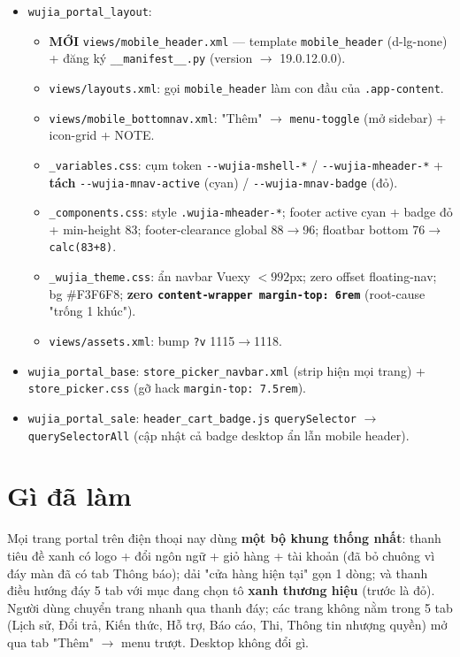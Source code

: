 \begin{itemize}
  \item \texttt{wujia\_portal\_layout}:
    \begin{itemize}
      \item \textbf{MỚI} \texttt{views/mobile\_header.xml} --- template
            \texttt{mobile\_header} (d-lg-none) + đăng ký \texttt{\_\_manifest\_\_.py}
            (version \(\rightarrow\) 19.0.12.0.0).
      \item \texttt{views/layouts.xml}: gọi \texttt{mobile\_header} làm con đầu của
            \texttt{.app-content}.
      \item \texttt{views/mobile\_bottomnav.xml}: "Thêm" \(\rightarrow\)
            \texttt{menu-toggle} (mở sidebar) + icon-grid + NOTE.
      \item \texttt{\_variables.css}: cụm token \texttt{-{}-wujia-mshell-*} /
            \texttt{-{}-wujia-mheader-*} + \textbf{tách} \texttt{-{}-wujia-mnav-active}
            (cyan) / \texttt{-{}-wujia-mnav-badge} (đỏ).
      \item \texttt{\_components.css}: style \texttt{.wujia-mheader-*}; footer
            active cyan + badge đỏ + min-height 83; footer-clearance global
            88\(\rightarrow\)96; floatbar bottom 76\(\rightarrow\)\texttt{calc(83+8)}.
      \item \texttt{\_wujia\_theme.css}: ẩn navbar Vuexy \(<992\)px; zero offset
            floating-nav; bg \#F3F6F8; \textbf{zero \texttt{content-wrapper
            margin-top: 6rem}} (root-cause "trống 1 khúc").
      \item \texttt{views/assets.xml}: bump \texttt{?v} 1115\(\rightarrow\)1118.
    \end{itemize}
  \item \texttt{wujia\_portal\_base}: \texttt{store\_picker\_navbar.xml} (strip hiện
        mọi trang) + \texttt{store\_picker.css} (gỡ hack \texttt{margin-top: 7.5rem}).
  \item \texttt{wujia\_portal\_sale}: \texttt{header\_cart\_badge.js}
        \texttt{querySelector} \(\rightarrow\) \texttt{querySelectorAll} (cập nhật
        cả badge desktop ẩn lẫn mobile header).
\end{itemize}

\section{Gì đã làm}

Mọi trang portal trên điện thoại nay dùng \textbf{một bộ khung thống nhất}: thanh
tiêu đề xanh có logo + đổi ngôn ngữ + giỏ hàng + tài khoản (đã bỏ chuông vì đáy
màn đã có tab Thông báo); dải "cửa hàng hiện tại" gọn 1 dòng; và thanh điều hướng
đáy 5 tab với mục đang chọn tô \textbf{xanh thương hiệu} (trước là đỏ). Người dùng
chuyển trang nhanh qua thanh đáy; các trang không nằm trong 5 tab (Lịch sử, Đổi
trả, Kiến thức, Hỗ trợ, Báo cáo, Thi, Thông tin nhượng quyền) mở qua tab "Thêm"
\(\rightarrow\) menu trượt. Desktop không đổi gì.

